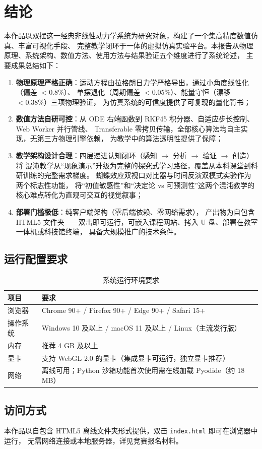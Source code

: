 \section{结论}

本作品以双摆这一经典非线性动力学系统为研究对象，构建了一个集高精度数值仿真、丰富可视化手段、
完整教学闭环于一体的虚拟仿真实验平台。本报告从物理原理、系统架构、数值方法、使用方法与结果验证五个维度进行了系统论述，
主要成果总结如下：

\begin{enumerate}[label=(\arabic*), leftmargin=*]
  \item \textbf{物理原理严格正确}：运动方程由拉格朗日力学严格导出，通过小角度线性化（偏差 $< 0.8\%$）、
       单摆退化（周期偏差 $< 0.05\%$）、能量守恒（漂移 $< 0.38\%$）三项物理验证，
       为仿真系统的可信度提供了可复现的量化背书；

  \item \textbf{数值方法自研可控}：从 ODE 右端函数到 RKF45 积分器、自适应步长控制、Web Worker 并行管线、
       Transferable 零拷贝传输，全部核心算法均自主实现，无第三方物理引擎依赖，
       为教学中的算法透明性提供了保障；

  \item \textbf{教学架构设计合理}：四层递进认知闭环（感知 $\to$ 分析 $\to$ 验证 $\to$ 创造）将
       混沌教学从“现象演示”升级为完整的探究式学习路径，覆盖从本科课堂到科研训练的完整需求梯度。
       蝴蝶效应双视口对比器与时间反演双模式实验作为两个标志性功能，
       将“初值敏感性”和“决定论 vs 可预测性”这两个混沌教学的核心难点转化为直观可交互的视觉叙事；

  \item \textbf{部署门槛极低}：纯客户端架构（零后端依赖、零网络需求），
       产出物为自包含 HTML5 文件夹——双击即可运行，可嵌入课程网站、拷入 U 盘、部署在教室一体机或科技馆终端，
       具备大规模推广的技术条件。
\end{enumerate}

\subsection*{运行配置要求}

\begin{table}[htbp]
  \centering
  \caption{系统运行环境要求}
  \label{tab:requirements}
  \begin{tabularx}{\textwidth}{l l}
    \toprule
    \textbf{项目} & \textbf{要求} \\
    \midrule
    浏览器 & Chrome 90+ / Firefox 90+ / Edge 90+ / Safari 15+ \\
    操作系统 & Windows 10 及以上 / macOS 11 及以上 / Linux（主流发行版） \\
    内存 & 推荐 4 GB 及以上 \\
    显卡 & 支持 WebGL 2.0 的显卡（集成显卡可运行，独立显卡推荐） \\
    网络 & 离线可用；Python 沙箱功能首次使用需在线加载 Pyodide（约 18 MB） \\
    \bottomrule
  \end{tabularx}
\end{table}

\subsection*{访问方式}

本作品以自包含 HTML5 离线文件夹形式提供，双击 \texttt{index.html} 即可在浏览器中运行，
无需网络连接或本地服务器，详见竞赛报名材料。

\endinput
